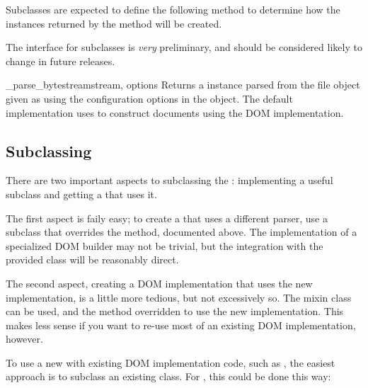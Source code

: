 \documentclass{howto}
\begin{document}
Subclasses are expected to define the following method to determine
how the  instances returned by the 
method will be created.

\begin{notice}[warning]
  The interface for subclasses is \emph{very} preliminary, and should
  be considered likely to change in future releases.
\end{notice}

\begin{methoddesc}[DOMBuilder]{_parse_bytestream}{stream, options}
  Returns a  instance parsed from the file object
  given as  using the configuration options in the
   object.  The default implementation  uses
   to construct documents using the
   DOM implementation.
\end{methoddesc}

\subsection{Subclassing }

There are two important aspects to subclassing the :
implementing a useful subclass and getting a 
that uses it.

The first aspect is faily easy; to create a  that
uses a different parser, use a subclass that overrides the
 method, documented above.  The
implementation of a specialized DOM builder may not be trivial, but
the integration with the provided  class will be
reasonably direct.

The second aspect, creating a DOM implementation that uses the new
 implementation, is a little more tedious, but not
excessively so.  The  mixin class can be
used, and the  method overridden to use the
new  implementation.  This makes less sense if you
want to re-use most of an existing DOM implementation, however.

To use a new  with existing DOM implementation code,
such as , the easiest approach is to subclass
an existing  class.  For
, this could be done this way:
\end{document}
